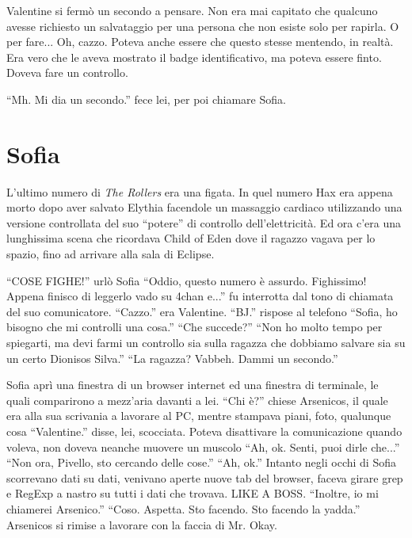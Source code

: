     Valentine si fermò un secondo a pensare. Non era mai capitato che qualcuno avesse richiesto un salvataggio per una
    persona che non esiste solo per rapirla. O per fare... Oh, cazzo. Poteva anche essere che questo stesse mentendo, in
    realtà. Era vero che le aveva mostrato il badge identificativo, ma poteva essere finto. Doveva fare un controllo.

    ``Mh. Mi dia un secondo.'' fece lei, per poi chiamare Sofia.

  \section*{Sofia}
    
    L'ultimo numero di \emph{The Rollers} era una figata. In quel numero Hax era appena morto dopo aver salvato Elythia
    facendole un massaggio cardiaco utilizzando una versione controllata del suo “potere” di controllo dell'elettricità.
    Ed ora c'era una lunghissima scena che ricordava Child of Eden dove il ragazzo vagava per lo spazio, fino ad
    arrivare alla sala di Eclipse.

    ``COSE FIGHE!'' urlò Sofia ``Oddio, questo numero è assurdo. Fighissimo! Appena finisco di leggerlo vado su 4chan
    e...'' fu interrotta dal tono di chiamata del suo comunicatore. ``Cazzo.'' era Valentine. ``BJ.'' rispose al
    telefono ``Sofia, ho bisogno che mi controlli una cosa.'' ``Che succede?'' ``Non ho molto tempo per spiegarti, ma
    devi farmi un controllo sia sulla ragazza che dobbiamo salvare sia su un certo Dionisos Silva.'' ``La ragazza?
    Vabbeh. Dammi un secondo.''

    Sofia aprì una finestra di un browser internet ed una finestra di terminale, le quali comparirono a mezz'aria
    davanti a lei. ``Chi è?'' chiese Arsenicos, il quale era alla sua scrivania a lavorare al PC, mentre stampava piani,
    foto, qualunque cosa ``Valentine.'' disse, lei, scocciata. Poteva disattivare la comunicazione quando voleva, non
    doveva neanche muovere un muscolo ``Ah, ok. Senti, puoi dirle che...'' ``Non ora, Pivello, sto cercando delle
    cose.'' ``Ah, ok.'' Intanto negli occhi di Sofia scorrevano dati su dati, venivano aperte nuove tab del browser,
    faceva girare grep e RegExp a nastro su tutti i dati che trovava. LIKE A BOSS. ``Inoltre, io mi chiamerei
    Arsenico.'' ``Coso. Aspetta. Sto facendo. Sto facendo la yadda.'' Arsenicos si rimise a lavorare con la faccia di
    Mr. Okay.

